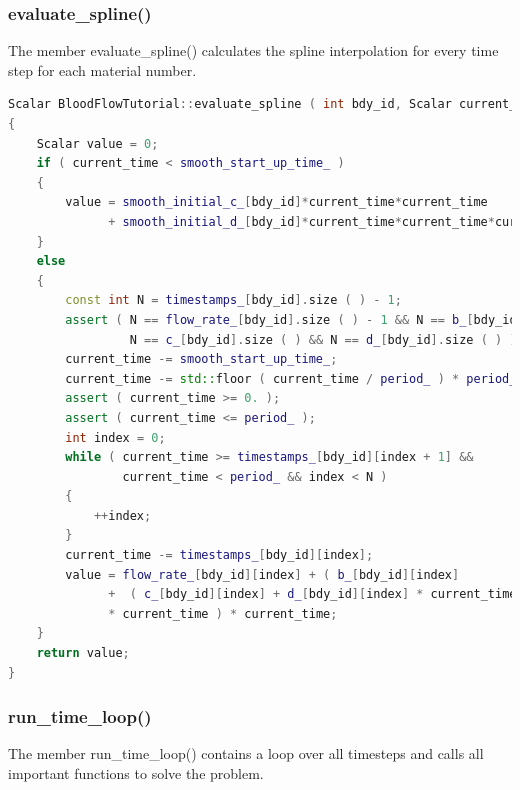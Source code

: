 \documentclass[a4paper, 11pt, twoside]{article}
\begin{document}
\subsubsection{evaluate\_spline()}
The member evaluate\_spline() calculates the spline interpolation for every time step for each material number.

\begin{lstlisting}[language=C++, basicstyle={\footnotesize, \ttfamily}, keywordstyle=\color{blue},  numbers=none, tabsize=4]
Scalar BloodFlowTutorial::evaluate_spline ( int bdy_id, Scalar current_time )
{
    Scalar value = 0;
    if ( current_time < smooth_start_up_time_ )
    {
        value = smooth_initial_c_[bdy_id]*current_time*current_time
              + smooth_initial_d_[bdy_id]*current_time*current_time*current_time;
    }
    else
    {
        const int N = timestamps_[bdy_id].size ( ) - 1;
        assert ( N == flow_rate_[bdy_id].size ( ) - 1 && N == b_[bdy_id].size ( ) && 
                 N == c_[bdy_id].size ( ) && N == d_[bdy_id].size ( ) );
        current_time -= smooth_start_up_time_;
        current_time -= std::floor ( current_time / period_ ) * period_;
        assert ( current_time >= 0. );
        assert ( current_time <= period_ );
        int index = 0;
        while ( current_time >= timestamps_[bdy_id][index + 1] && 
                current_time < period_ && index < N )
        {
            ++index;
        }
        current_time -= timestamps_[bdy_id][index];
        value = flow_rate_[bdy_id][index] + ( b_[bdy_id][index] 
              +  ( c_[bdy_id][index] + d_[bdy_id][index] * current_time ) 
              * current_time ) * current_time;
    }
    return value;
}
\end{lstlisting}

\subsubsection{run\_time\_loop()}
The member run\_time\_loop() contains a loop over all timesteps and calls all important functions to solve the problem.
\end{document}
